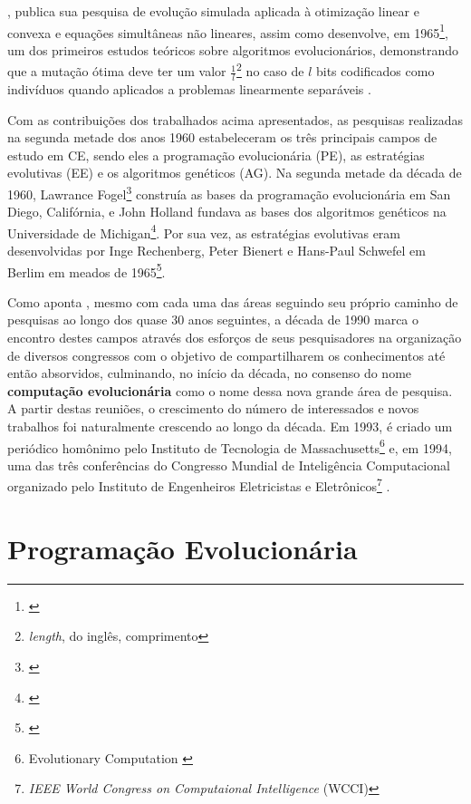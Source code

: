 \cite{bremermann_optimization_1962}, publica sua pesquisa de evolução simulada aplicada à otimização linear e convexa e equações simultâneas não lineares, assim como desenvolve, em 1965\footnote{\cite{search_evolution_biophysics_1965}}, um dos primeiros estudos teóricos sobre algoritmos evolucionários, demonstrando que a mutação ótima deve ter um valor $\frac{1}{l}$\footnote{\textit{length}, do inglês, comprimento} no caso de $l$ bits codificados como indivíduos quando aplicados a problemas linearmente separáveis .

Com as contribuições dos trabalhados acima apresentados, as pesquisas realizadas na segunda metade dos anos 1960 estabeleceram os três principais campos de estudo em CE, sendo eles a programação evolucionária (PE), as estratégias evolutivas (EE) e os algoritmos genéticos (AG). Na segunda metade da década de 1960, Lawrance Fogel\footnote{\cite{Fogel1966ArtificialIT}} construía as bases da programação evolucionária em San Diego, Califórnia, e John Holland fundava as bases dos algoritmos genéticos na Universidade de Michigan\footnote{\cite{holland_1962}}. Por sua vez, as estratégias evolutivas eram desenvolvidas por Inge Rechenberg, Peter Bienert e Hans-Paul Schwefel em Berlim em meados de 1965\footnote{\cite{rechenberg_cybernetic_1965}}.

Como aponta \cite{back_handbook_1997}, mesmo com cada uma das áreas seguindo seu próprio caminho de pesquisas ao longo dos quase 30 anos seguintes, a década de 1990 marca o encontro destes campos através dos esforços de seus pesquisadores na organização de diversos congressos com o objetivo de compartilharem os conhecimentos até então absorvidos, culminando, no início da década, no consenso do nome \textbf{computação evolucionária} como o nome dessa nova grande área de pesquisa. A partir destas reuniões, o crescimento do número de interessados e novos trabalhos foi naturalmente crescendo ao longo da década. Em 1993, é criado um periódico homônimo pelo Instituto de Tecnologia de Massachusetts\footnote{Evolutionary Computation \citeyearpar{noauthor_editorial_1993}} e, em 1994, uma das três conferências do Congresso Mundial de Inteligência Computacional organizado pelo Instituto de Engenheiros Eletricistas e Eletrônicos\footnote{\textit{IEEE World Congress on Computaional Intelligence} (WCCI)} .

\section{Programação Evolucionária}


